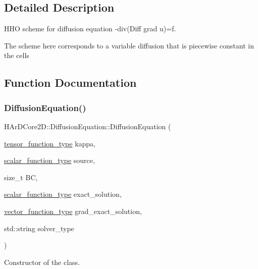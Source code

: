 \subsection{Detailed Description}
H\+HO scheme for diffusion equation -\/div(Diff grad u)=f. 

The scheme here corresponds to a variable diffusion that is piecewise constant in the cells 

\subsection{Function Documentation}
\mbox{\label{group__HHO__diffusion_ga9a10d995a8b537474dc0d9a2e0a9a04b}} 
\subsubsection{\texorpdfstring{Diffusion\+Equation()}{DiffusionEquation()}}
{\footnotesize\ttfamily H\+Ar\+D\+Core2\+D\+::\+Diffusion\+Equation\+::\+Diffusion\+Equation (\begin{DoxyParamCaption}\item[{\hyperlink{classHArDCore2D_1_1DiffusionEquation_acb28d76dbd9b3c07f20a996f74915b76}{tensor\+\_\+function\+\_\+type}}]{kappa,  }\item[{\hyperlink{classHArDCore2D_1_1DiffusionEquation_ae1c7c45bf1c9402b11d431716f5e1936}{scalar\+\_\+function\+\_\+type}}]{source,  }\item[{size\+\_\+t}]{BC,  }\item[{\hyperlink{classHArDCore2D_1_1DiffusionEquation_ae1c7c45bf1c9402b11d431716f5e1936}{scalar\+\_\+function\+\_\+type}}]{exact\+\_\+solution,  }\item[{\hyperlink{classHArDCore2D_1_1DiffusionEquation_a8fb1165da7a58b15bc4ed9a86829290a}{vector\+\_\+function\+\_\+type}}]{grad\+\_\+exact\+\_\+solution,  }\item[{std\+::string}]{solver\+\_\+type }\end{DoxyParamCaption})}



Constructor of the class. 


